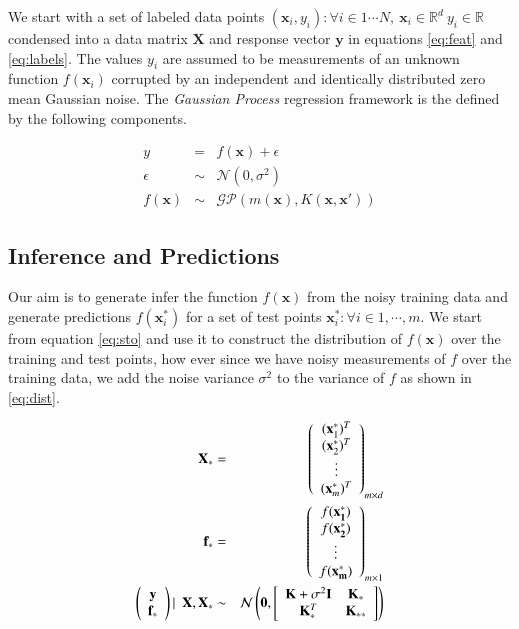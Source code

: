 \documentclass[referee,a4paper,12pt,traditabstract]{swsc}
\begin{document}
\begin{linenumbers}
We start with a set of labeled data points $ {(\mathbf{x}_i, y_i): \forall i \in 1 \cdots N, \ \mathbf{x}_i \in \mathbb{R}^d \ y_i \in \mathbb{R}} $ condensed into a data matrix $\mathbf{X}$ and response vector $\mathbf{y}$ in equations \ref{eq:feat} and \ref{eq:labels}. The values $y_i$ are assumed to be measurements of an unknown function $f(\mathbf{x}_i)$ corrupted by an independent and identically distributed zero mean Gaussian noise. The \emph{Gaussian Process} regression framework is the defined by the following components.

\begin{eqnarray}
      y & = & f(\mathbf{x}) + \epsilon  \\
      \epsilon & \sim & \mathcal{N}(0, \sigma^2) \\
      f(\mathbf{x}) & \sim & \mathcal{GP}(m(\mathbf{x}), K(\mathbf{x},\mathbf{x}')) 
\end{eqnarray}


\subsection{Inference and Predictions}

Our aim is to generate infer the function $f(\mathbf{x})$ from the noisy training data and generate predictions $f(\mathbf{x}^{*}_i)$ for a set of test points $ {\mathbf{x}^{*}_i : \forall i \in 1, \cdots, m} $. We start from equation \ref{eq:sto} and use it to construct the distribution of $f(\mathbf{x})$ over the training and test points, how ever since we have noisy measurements of $f$ over the training data, we add the noise variance $\sigma^2$ to the variance of $f$ as shown in \ref{eq:dist}.

\begin{eqnarray}
    \mathbf{X}_* & = & \left( \begin{array}{c} (\mathbf{x}^{*}_1)^T \\ (\mathbf{x}^{*}_2)^T \\ \vdots \\ (\mathbf{x}^{*}_m)^T \end{array} \right)_{m \times d} \\
    \mathbf{f}_* & = & \left( \begin{array}{c} f(\mathbf{x^{*}_1}) \\ f(\mathbf{x^{*}_2}) \\ \vdots \\ f(\mathbf{x^{*}_m}) \end{array} \right)_{m \times 1} \\
     \vspace{4\baselineskip}
    \left( \begin{array}{c} \mathbf{y} \\ \mathbf{f_*} \end{array} \right) | \ \ \mathbf{X}, \mathbf{X}_* & \sim & 
    \mathcal{N}\left(\mathbf{0}, \left[ \begin{array}{cc} \mathbf{K} + \sigma^{2} \mathbf{I} & \mathbf{K}_{*} \\ \mathbf{K}_{*}^T & \mathbf{K}_{**} \end{array} \right ] \right) \label{eq:dist}
\end{eqnarray}


\end{linenumbers}
\end{document}
